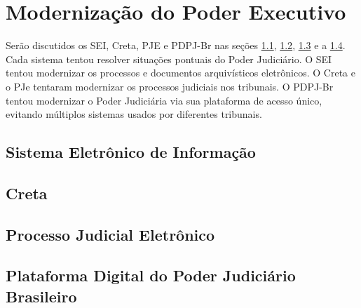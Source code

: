 \section{Modernização do Poder Executivo}   


Serão discutidos os SEI, Creta, PJE e PDPJ-Br nas seções \ref{subsec:sei}, \ref{subsec:creta}, \ref{subsec:pje} e a \ref{subsec:pdpjbr}. Cada sistema tentou resolver situações pontuais do Poder Judiciário. O SEI tentou modernizar os processos e documentos arquivísticos eletrônicos. O Creta e o PJe tentaram modernizar os processos judiciais nos tribunais. O PDPJ-Br tentou modernizar o Poder Judiciária via sua plataforma de acesso único, evitando múltiplos sistemas usados por diferentes tribunais. 

\subsection{Sistema Eletrônico de Informação}
\label{subsec:sei}

\subsection{Creta}
\label{subsec:creta}

\subsection{Processo Judicial Eletrônico}
\label{subsec:pje}

\subsection{Plataforma Digital do Poder Judiciário Brasileiro}
\label{subsec:pdpjbr}




